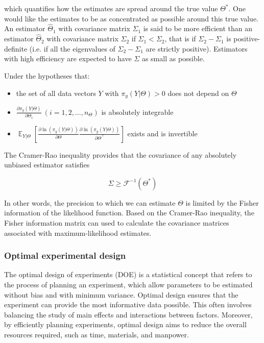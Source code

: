 \documentclass[../Article_Design_of_Experiment.tex]{subfiles}
\begin{document}
	which quantifies how the estimates are spread around the true value $\Theta^*$. One would like the estimates to be as concentrated as possible around this true value. An estimator $\hat{\Theta}_1$ with covariance matrix $\Sigma_1$ is said to be more efficient than an estimator $\hat{\Theta}_2$ with covariance matrix $\Sigma_2$ if $\Sigma_1 < \Sigma_2$, that is if $\Sigma_2 - \Sigma_1$ is positive-definite (i.e. if all the eigenvalues of $\Sigma_2-\Sigma_1$ are strictly positive). Estimators with high efficiency are expected to have $\Sigma$ as small as possible. 
	
	Under the hypotheses that:
	
	\begin{itemize}
		\item the set of all data vectors $Y$ with $\pi_y(Y|\Theta) > 0$ does not depend on $\Theta$
		\item $\frac{\partial \pi_y(Y|\Theta)}{\partial \Theta_i}~\left(i=1,2,...,n_\Theta\right)$ is absolutely integrable
		\item $\mathop{\mathbb{E}}_{Y|\Theta} \left[ \frac{\partial \ln (\pi_y (Y|\Theta))}{\partial \Theta} \frac{\partial \ln (\pi_y (Y|\Theta))}{\partial \Theta^\top} \right]$ exists and is invertible
	\end{itemize}
	
	The Cramer-Rao inequality provides that the covariance of any absolutely unbiased estimator satisfies
	
	{\footnotesize
	\begin{equation}
		\Sigma \geq \mathcal{F}^{-1}(\Theta^*)
	\end{equation} }
	
	In other words, the precision to which we can estimate $\Theta$ is limited by the Fisher information of the likelihood function. Based on the Cramer-Rao inequality, the Fisher information matrix can used to calculate the covariance matrices associated with maximum-likelihood estimates.
	
	\subsubsection{Optimal experimental design}
	
	The optimal design of experiments (DOE) is a statistical concept that refers to the process of planning an experiment, which allow parameters to be estimated without bias and with minimum variance. Optimal design ensures that the experiment can provide the most informative data possible. This often involves balancing the study of main effects and interactions between factors. Moreover, by efficiently planning experiments, optimal design aims to reduce the overall resources required, such as time, materials, and manpower.
	
\end{document}
